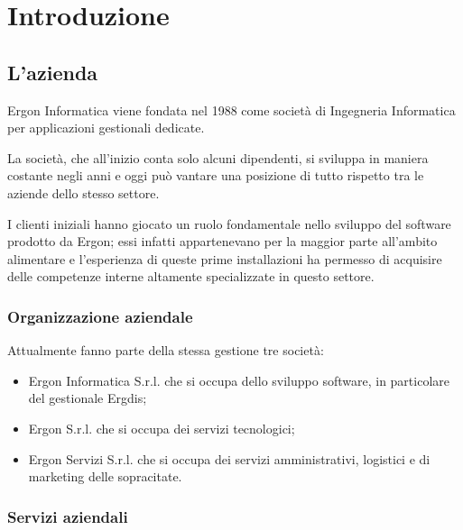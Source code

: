 \chapter{Introduzione}

\section{L'azienda}
Ergon Informatica viene fondata nel 1988 come società di Ingegneria Informatica per applicazioni gestionali dedicate.

La società, che all'inizio conta solo alcuni dipendenti, si sviluppa in maniera costante negli anni e oggi può vantare una posizione di tutto rispetto tra le aziende dello stesso settore.

I clienti iniziali hanno giocato un ruolo fondamentale nello sviluppo del software prodotto da Ergon; essi infatti appartenevano per la maggior parte all'ambito alimentare e l'esperienza di queste prime installazioni ha permesso di acquisire delle competenze interne altamente specializzate in questo settore. 
\subsection{Organizzazione aziendale}
Attualmente fanno parte della stessa gestione tre società:

\begin{itemize}
\item Ergon Informatica S.r.l. che si occupa dello sviluppo software, in particolare del gestionale Ergdis;
\item Ergon S.r.l. che si occupa dei servizi tecnologici;
\item Ergon Servizi S.r.l. che si occupa dei servizi amministrativi, logistici e di marketing delle sopracitate.
\end{itemize}

\subsection{Servizi aziendali}

